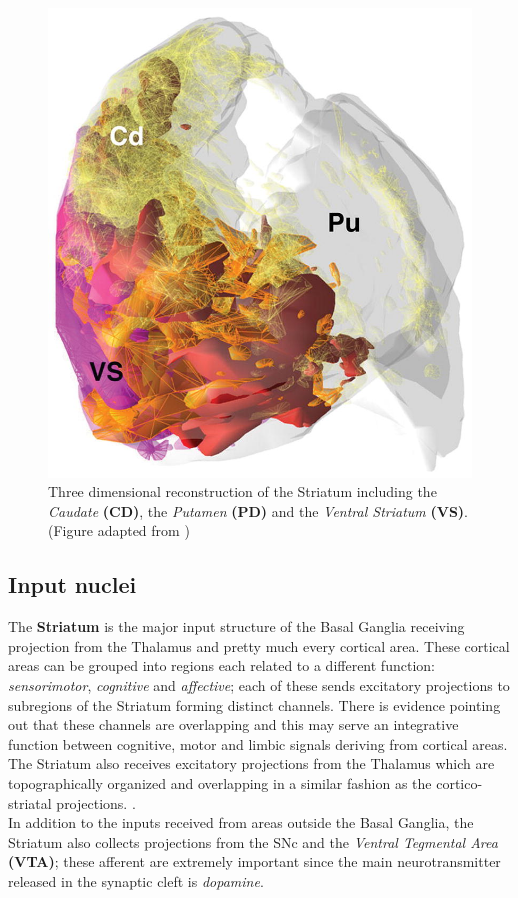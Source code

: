 \documentclass[MSc,english]{Container/thesistemplate}
\begin{document}
\begin{figure}[ht!]
  \centering
    \includegraphics[scale=.8]{Images/striatumrec.jpg}
    \caption{Three dimensional reconstruction of the Striatum including the \emph{Caudate} \textbf{(CD)}, the \emph{Putamen} \textbf{(PD)} and the \emph{Ventral Striatum} \textbf{(VS)}. (Figure adapted from \cite{striatalfigure})}
\end{figure}

\subsection*{Input nuclei}
The \textbf{Striatum} is the major input structure of the Basal Ganglia receiving projection from the Thalamus and pretty much every cortical area. These cortical areas can be grouped into regions each related to a different function: \emph{sensorimotor}, \emph{cognitive} and \emph{affective}; each of these sends excitatory projections to subregions of the Striatum forming distinct channels. There is evidence pointing out that these channels are overlapping and this may serve an integrative function between cognitive, motor and limbic signals deriving from cortical areas. 
\\ The Striatum also receives excitatory projections from the Thalamus which are topographically organized and overlapping in a similar fashion as the cortico-striatal projections. \cite{nelsonkreitzer}.
\\ In addition to the inputs received from areas outside the Basal Ganglia, the Striatum also collects projections from the SNc and the \emph{Ventral Tegmental Area} \textbf{(VTA)}; these afferent are extremely important since the main neurotransmitter released in the synaptic cleft is \emph{dopamine}. 
\end{document}
